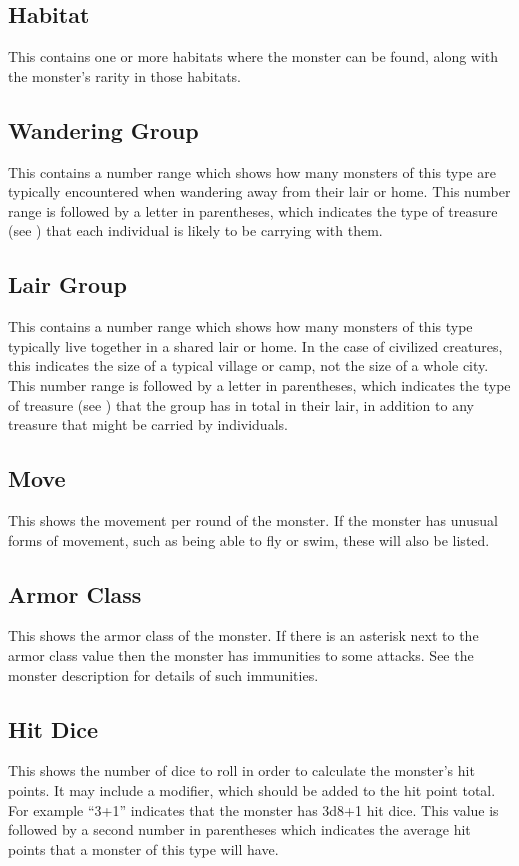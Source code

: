 \begin{multicols*}{2}
\subsection{Habitat}
This contains one or more habitats where the monster can be found, along with the monster’s rarity in those habitats.

\subsection{Wandering Group}
This contains a number range which shows how many monsters of this type are typically encountered when wandering away from their lair or home. This number range is followed by a letter in parentheses, which indicates the type of treasure (see ) that each individual is likely to be carrying with them.

\subsection{Lair Group}
This contains a number range which shows how many monsters of this type typically live together in a shared lair or home. In the case of civilized creatures, this indicates the size of a typical village or camp, not the size of a whole city. This number range is followed by a letter in parentheses, which indicates the type of treasure (see ) that the group has in total in their lair, in addition to any treasure that might be carried by individuals.

\subsection{Move}
This shows the movement per round of the monster. If the monster has unusual forms of movement, such as being able to fly or swim, these will also be listed.

\subsection{Armor Class}
This shows the armor class of the monster. If there is an asterisk next to the armor class value then the monster has immunities to some attacks. See the monster description for details of such immunities.

\subsection{Hit Dice}
This shows the number of dice to roll in order to calculate the monster’s hit points. It may include a modifier, which should be added to the hit point total. For example “3+1” indicates that the monster has 3d8+1 hit dice. This value is followed by a second number in parentheses which indicates the average hit points that a monster of this type will have.


\end{multicols*}
